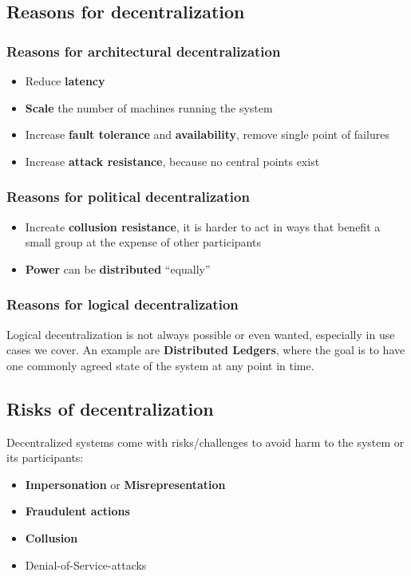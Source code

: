 \documentclass[12pt,A4]{extarticle}
\begin{document}
\subsection{Reasons for decentralization}
\subsubsection{Reasons for architectural decentralization}
\begin{itemize}
  \item{Reduce \textbf{latency}}
  \item{\textbf{Scale} the number of machines running the system}
  \item{Increase \textbf{fault tolerance} and \textbf{availability}, remove single point of failures}
  \item{Increase \textbf{attack resistance}, because no central points exist}
\end{itemize}

\subsubsection{Reasons for political decentralization}
\begin{itemize}
  \item{Increate \textbf{collusion resistance}, it is harder to act in ways that benefit a small group at the expense of other participants}
  \item{\textbf{Power} can be \textbf{distributed} ``equally''}
\end{itemize}

\subsubsection{Reasons for logical decentralization}
Logical decentralization is not always possible or even wanted, especially in use cases we cover. An example are \textbf{Distributed Ledgers}, where the goal is to have one commonly agreed state of the system at any point in time.

\subsection{Risks of decentralization}
Decentralized systems come with risks/challenges to avoid harm to the system or its participants:
\begin{itemize}
  \item{\textbf{Impersonation} or \textbf{Misrepresentation}}
  \item{\textbf{Fraudulent actions}}
  \item{\textbf{Collusion}}
  \item{Denial-of-Service-attacks}
\end{itemize}
\end{document}
